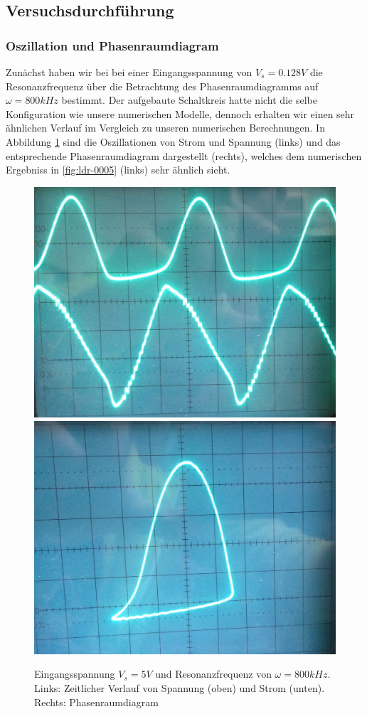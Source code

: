 \documentclass{scrartcl}
\begin{document}
\subsection { Versuchsdurchführung }
\subsubsection { Oszillation und Phasenraumdiagram }
Zunächst haben wir bei bei einer Eingangsspannung von $V_s=0.128V$ die Resonanzfrequenz über die Betrachtung des Phasenraumdiagramms auf $\omega=800kHz$ bestimmt. 
Der aufgebaute Schaltkreis hatte nicht die selbe Konfiguration wie unsere numerischen Modelle, dennoch erhalten wir einen sehr ähnlichen Verlauf im Vergleich zu unseren numerischen Berechnungen. In Abbildung \ref{fig:ldr-real1} sind die Oszillationen von Strom und Spannung (links) und das entsprechende Phasenraumdiagram dargestellt (rechts), welches dem numerischen Ergebniss in \ref{fig:ldr-0005} (links) sehr ähnlich sieht. 
\begin{figure}
\centering
\includegraphics[scale=0.1]{800khz-5V-oszi}
\includegraphics[scale=0.11]{800khz-5V-phase}
\caption{Eingangsspannung $V_s=5V$ und Resonanzfrequenz von $\omega=800kHz$. Links: Zeitlicher Verlauf von Spannung (oben) und Strom (unten). Rechts: Phasenraumdiagram}
\label{fig:ldr-real1}
\end{figure}
\end{document}
